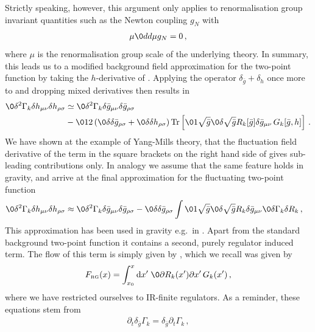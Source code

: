 \documentclass[11pt]{book} %
\newcommand{\Tr}{\mathrm{Tr}}
\begin{document}
{Strictly speaking, however, this
argument only applies to renormalisation group invariant quantities
such as the Newton coupling $g_N$ with
\begin{align}
	\mu\0{d}{d\mu} g_N=0\,,
\end{align}
where $\mu$ is the renormalisation group scale of the underlying
theory. In summary, this leads us to a modified background field
approximation for the two-point function by taking the $h$-derivative
of .
Applying the operator $\delta_{\bar g} + \delta_h$ once more to
 and dropping mixed derivatives then results in
\begin{align}
	\0{\delta^2 \Gamma_k}{\delta h_{\mu\nu}\delta h_{\rho\sigma}}&\simeq
	\0{\delta^2 \Gamma_k}{\delta \bar g_{\mu\nu}\delta \bar g_{\rho\sigma}}  \notag \\
	&-\012 \left(\0{\delta}{\delta\bar g_{\rho\sigma}}+\0{\delta}{\delta h_{\rho\sigma}}
		\right) \Tr\left[ \0{1}{\sqrt{\bar g}}\0{\delta \sqrt{\bar g} R_k[\bar g]}{\delta \bar g_{\mu\nu}}\, G_k[\bar
	g, h]\right]\,.
\label{eq:gravpropNIk}
\end{align}
We have shown at the example of Yang-Mills theory, that the
fluctuation field derivative of the term in the square brackets on the
right hand side of  gives sub-leading
contributions only.
In analogy we assume that the same feature holds in
gravity, and arrive at the final approximation for the fluctuating
two-point function
\begin{align} \label{eq:modback}
	\0{\delta^2 \Gamma_k}{\delta h_{\mu\nu}\delta h_{\rho\sigma}}&\approx \0{\delta^2 \Gamma_k}{\delta \bar g_{\mu\nu}\delta \bar g_{\rho\sigma}}
	- \0{\delta}{\delta \bar g_{\rho\sigma}} \int \0{1}{\sqrt{\bar g}}\0{\delta \sqrt{\bar g} R_k}{\delta \bar g_{\mu\nu}}\0{\delta
	\Gamma_k}{\delta R_k}\,,
\end{align}
This approximation has been used in gravity e.g.\ in
\cite{Donkin,Donkin:2012ud}. Apart from the standard background
two-point function it contains a second, purely regulator induced term.
The flow of this term is simply given by
, which we recall was given by
\begin{align}\label{eq:Fg}
	F_{\text{\tiny RG}}(x)= \int_{x_0}^x \mathrm dx' \; \0{\partial R_k(x')}{\partial x'} \, G_k(x')\,,
\end{align}
where we have restricted ourselves to IR-finite regulators.
As a reminder, these equations stem from
\begin{align}
 \partial_t \delta_{\bar g} \Gamma_k = \delta_{\bar g} \partial_t \Gamma_k \,,

\end{align}}
\end{document}
